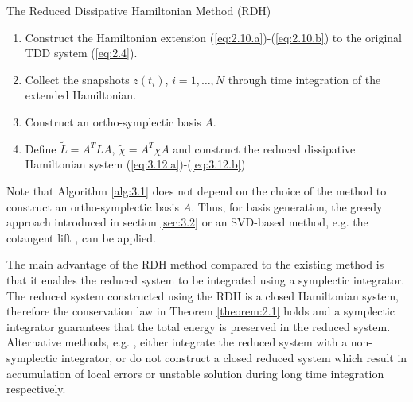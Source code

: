 \begin{algorithm}
\caption{The Reduced Dissipative Hamiltonian Method (RDH)} \label{alg:3.1}
\begin{enumerate}
	\item Construct the Hamiltonian extension (\ref{eq:2.10.a})-(\ref{eq:2.10.b}) to the original TDD system (\ref{eq:2.4}).
	\item Collect the snapshots $z(t_i)$, $i=1,\dots,N$ through time integration of the extended Hamiltonian.
	\item Construct an ortho-symplectic basis $A$.
	\item Define $\tilde L = A^T L A$, $\tilde \chi = A^T \chi A$ and construct the reduced dissipative Hamiltonian system (\ref{eq:3.12.a})-(\ref{eq:3.12.b})
\end{enumerate}
\end{algorithm}

Note that Algorithm \ref{alg:3.1} does not depend on the choice of the method to construct an ortho-symplectic basis $A$. Thus, for basis generation, the greedy approach introduced in section \ref{sec:3.2} or an SVD-based method, e.g. the cotangent lift \cite{Peng:2014di}, can be applied.

The main advantage of the RDH method compared to the existing method is that it enables the reduced system to be integrated using a symplectic integrator. The reduced system constructed using the RDH is a closed Hamiltonian system, therefore the conservation law in Theorem \ref{theorem:2.1} holds and a symplectic integrator guarantees that the total energy is preserved in the reduced system. Alternative methods, e.g. \cite{peng2016geometric,Polyuga:2010gj,beattie2011structure}, either integrate the reduced system with a non-symplectic integrator, or do not construct a closed reduced system which result in accumulation of local errors or unstable solution during long time integration respectively.
